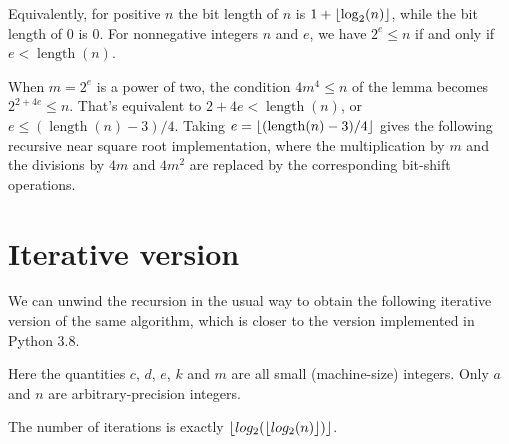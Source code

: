 \documentclass[a4paper]{article}
\DeclarePairedDelimiter\floor{\lfloor}{\rfloor}
\DeclareMathOperator{\length}{length}
\theoremstyle{plain}
\theoremstyle{definition}
\begin{document}
Equivalently, for positive $n$ the bit length of $n$ is $1 +
\floor{\log_2(n)}$, while the bit length of $0$ is $0$. For nonnegative
integers $n$ and $e$, we have $2^e \le n$ if and only if $e < \length(n)$.

When $m = 2^e$ is a power of two, the condition $4m^4 \le n$ of the lemma becomes $2^{2 +
4e} \le n$. That's equivalent to $2 + 4e < \length(n)$, or $e \le (\length(n) -
3) / 4$. Taking $e = \floor{(\length(n) - 3) / 4}$ gives the following
recursive near square root implementation, where the multiplication by $m$ and
the divisions by $4m$ and $4m^2$ are replaced by the corresponding bit-shift
operations.



\section{Iterative version}

We can unwind the recursion in the usual way to obtain the following
iterative version of the same algorithm, which is closer to the version
implemented in Python 3.8.



Here the quantities $c$, $d$, $e$, $k$ and $m$ are all small (machine-size)
integers. Only $a$ and $n$ are arbitrary-precision integers.

The number of iterations is exactly $\floor{log_2(\floor{log_2(n)})}$.
\end{document}
